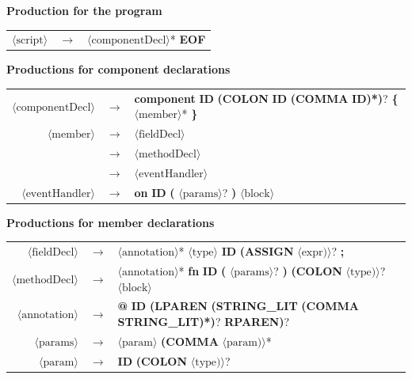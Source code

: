 \documentclass[11pt,a4paper]{article}
\begin{document}
\vspace{1.5em}
\noindent\textbf{Production for the program}

\begin{longtable}{r c l}
$\langle\text{script}\rangle$ & $\rightarrow$ & $\langle\text{componentDecl}\rangle$* \textbf{EOF} \\
\end{longtable}

\noindent\textbf{Productions for component declarations}

\begin{longtable}{r c l}
$\langle\text{componentDecl}\rangle$ & $\rightarrow$ & \textbf{component} \textbf{ID} \textbf{(COLON} \textbf{ID} \textbf{(COMMA} \textbf{ID)*)}? \textbf{\{} $\langle\text{member}\rangle$* \textbf{\}} \\
$\langle\text{member}\rangle$ & $\rightarrow$ & $\langle\text{fieldDecl}\rangle$ \\
 & $\rightarrow$ & $\langle\text{methodDecl}\rangle$ \\
 & $\rightarrow$ & $\langle\text{eventHandler}\rangle$ \\
$\langle\text{eventHandler}\rangle$ & $\rightarrow$ & \textbf{on} \textbf{ID} \textbf{(} $\langle\text{params}\rangle$? \textbf{)} $\langle\text{block}\rangle$ \\
\end{longtable}

\noindent\textbf{Productions for member declarations}

\begin{longtable}{r c l}
$\langle\text{fieldDecl}\rangle$ & $\rightarrow$ & $\langle\text{annotation}\rangle$* $\langle\text{type}\rangle$ \textbf{ID} \textbf{(ASSIGN} $\langle\text{expr)}\rangle$? \textbf{;} \\
$\langle\text{methodDecl}\rangle$ & $\rightarrow$ & $\langle\text{annotation}\rangle$* \textbf{fn} \textbf{ID} \textbf{(} $\langle\text{params}\rangle$? \textbf{)} \textbf{(COLON} $\langle\text{type)}\rangle$? $\langle\text{block}\rangle$ \\
$\langle\text{annotation}\rangle$ & $\rightarrow$ & \textbf{@} \textbf{ID} \textbf{(LPAREN} \textbf{(STRING\_LIT} \textbf{(COMMA} \textbf{STRING\_LIT)*)}? \textbf{RPAREN)}? \\
$\langle\text{params}\rangle$ & $\rightarrow$ & $\langle\text{param}\rangle$ \textbf{(COMMA} $\langle\text{param)}\rangle$* \\
$\langle\text{param}\rangle$ & $\rightarrow$ & \textbf{ID} \textbf{(COLON} $\langle\text{type)}\rangle$? \\
\end{longtable}
\end{document}
